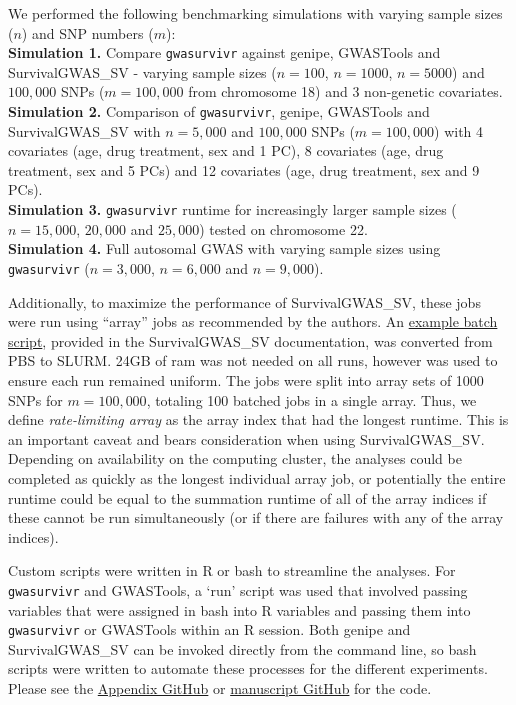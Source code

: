 \documentclass[]{DissertateOSU}
\begin{document}
We performed the following benchmarking simulations with varying sample
sizes (\(n\)) and SNP numbers (\(m\)):\\
\noindent \textbf{Simulation 1.} Compare \texttt{gwasurvivr} against
genipe, GWASTools and SurvivalGWAS\_SV - varying sample sizes
(\(n=100\), \(n=1000\), \(n=5000\)) and \(100,000\) SNPs (\(m=100,000\)
from chromosome 18) and 3 non-genetic covariates.\\
\noindent \textbf{Simulation 2.} Comparison of \texttt{gwasurvivr},
genipe, GWASTools and SurvivalGWAS\_SV with \(n=5,000\) and \(100,000\)
SNPs (\(m=100,000\)) with 4 covariates (age, drug treatment, sex and 1
PC), 8 covariates (age, drug treatment, sex and 5 PCs) and 12 covariates
(age, drug treatment, sex and 9 PCs).\\
\noindent \textbf{Simulation 3.} \texttt{gwasurvivr} runtime for
increasingly larger sample sizes (\(n=15,000\), \(20,000\) and
\(25,000\)) tested on chromosome 22.\\
\noindent \textbf{Simulation 4.} Full autosomal GWAS with varying sample
sizes using \texttt{gwasurvivr} (\(n=3,000\), \(n=6,000\) and
\(n=9,000\)).

Additionally, to maximize the performance of SurvivalGWAS\_SV, these
jobs were run using ``array'' jobs as recommended by the authors. An
\href{https://www.liverpool.ac.uk/media/livacuk/instituteoftranslationalmedicine/biostats/batchexample.sh}{example
batch script}, provided in the SurvivalGWAS\_SV documentation, was
converted from PBS to SLURM. 24GB of ram was not needed on all runs,
however was used to ensure each run remained uniform. The jobs were
split into array sets of 1000 SNPs for \(m=100,000\), totaling 100
batched jobs in a single array. Thus, we define \emph{rate-limiting
array} as the array index that had the longest runtime. This is an
important caveat and bears consideration when using SurvivalGWAS\_SV.
Depending on availability on the computing cluster, the analyses could
be completed as quickly as the longest individual array job, or
potentially the entire runtime could be equal to the summation runtime
of all of the array indices if these cannot be run simultaneously (or if
there are failures with any of the array indices).

Custom scripts were written in R or bash to streamline the analyses. For
\texttt{gwasurvivr} and GWASTools, a `run' script was used that involved
passing variables that were assigned in bash into R variables and
passing them into \texttt{gwasurvivr} or GWASTools within an R session.
Both genipe and SurvivalGWAS\_SV can be invoked directly from the
command line, so bash scripts were written to automate these processes
for the different experiments. Please see the
\href{https://github.com/aarizvi/dissertation/tree/master/code/chapter3}{Appendix
GitHub} or
\href{https://github.com/suchestoncampbelllab/gwasurvivr_manuscript}{manuscript
GitHub} for the code.
\end{document}

